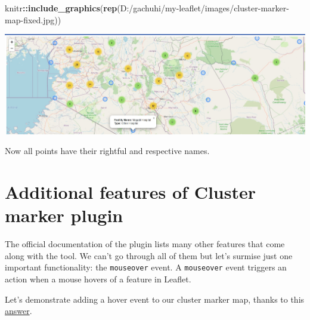 \documentclass[
]{book}
\newenvironment{Shaded}{\begin{snugshade}}{\end{snugshade}}
\newcommand{\FunctionTok}[1]{\textcolor[rgb]{0.13,0.29,0.53}{\textbf{#1}}}
\newcommand{\NormalTok}[1]{#1}
\newcommand{\SpecialCharTok}[1]{\textcolor[rgb]{0.81,0.36,0.00}{\textbf{#1}}}
\newcommand{\StringTok}[1]{\textcolor[rgb]{0.31,0.60,0.02}{#1}}
\begin{document}
\begin{Shaded}
\begin{Highlighting}[]
\NormalTok{knitr}\SpecialCharTok{::}\FunctionTok{include\_graphics}\NormalTok{(}\FunctionTok{rep}\NormalTok{(}\StringTok{\textquotesingle{}D:/gachuhi/my{-}leaflet/images/cluster{-}marker{-}map{-}fixed.jpg\textquotesingle{}}\NormalTok{))}
\end{Highlighting}
\end{Shaded}

\includegraphics{../images/cluster-marker-map-fixed.jpg}

Now all points have their rightful and respective names.

\hypertarget{additional-features-of-cluster-marker-plugin}{%
\section{Additional features of Cluster marker plugin}\label{additional-features-of-cluster-marker-plugin}}

The official documentation of the plugin lists many other features that come along with the tool. We can't go through all of them but let's surmise just one important functionality: the \texttt{mouseover} event. A \texttt{mouseover} event triggers an action when a mouse hovers of a feature in Leaflet.

Let's demonstrate adding a hover event to our cluster marker map, thanks to this \href{https://gnisitricks.de/2019/03/Adding-Click-and-Mouseover-Events-simultaneously-to-GeoJson-Markers-on-a-Leaflet-Map/}{answer}.
\end{document}
